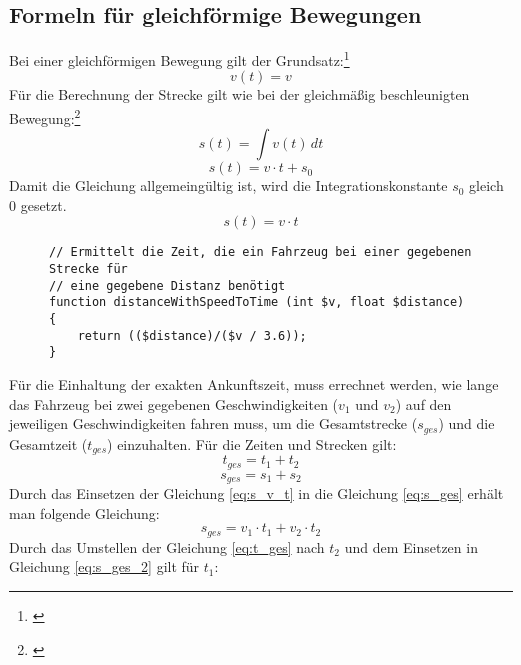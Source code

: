\subsection{Formeln für gleichförmige Bewegungen} \label{formulaGleichfoermig}
Bei einer gleichförmigen Bewegung gilt der Grundsatz:\footnote{\citet[S. 22]{richard2011technische}}
\begin{equation}
v(t) = v
\end{equation}
Für die Berechnung der Strecke gilt wie bei der gleichmäßig beschleunigten Bewegung:\footnote{\citet[S. 20]{richard2011technische}}
\begin{equation}
s(t) = \int v(t) \,dt
\end{equation}
\begin{equation}
s(t) =v \cdot t + s_{0}
\end{equation}
Damit die Gleichung allgemeingültig ist, wird die Integrationskonstante $s_{0}$ gleich 0 gesetzt.
\begin{equation}
s(t) =v \cdot t
\label{eq:s_v_t}
\end{equation}
\begin{figure}[H]
\begin{lstlisting}[caption={\textit{distanceWithSpeedToTime$($$)$} (\textit{functions\_math.php})},captionpos=b,label={lst:distanceWithSpeedToTime}]
// Ermittelt die Zeit, die ein Fahrzeug bei einer gegebenen Strecke für
// eine gegebene Distanz benötigt
function distanceWithSpeedToTime (int $v, float $distance) {
	return (($distance)/($v / 3.6));
}
\end{lstlisting}
\end{figure}
Für die Einhaltung der exakten Ankunftszeit, muss errechnet werden, wie lange das Fahrzeug bei zwei gegebenen Geschwindigkeiten ($v_1$ und $v_2$) auf den jeweiligen Geschwindigkeiten fahren muss, um die Gesamtstrecke ($s_{ges}$) und die Gesamtzeit ($t_{ges}$) einzuhalten. Für die Zeiten und Strecken gilt:
\begin{equation}
\label{eq:t_ges}
t_{ges} = t_{1} + t_{2}
\end{equation}
\begin{equation}
\label{eq:s_ges}
s_{ges} = s_{1} + s_{2}
\end{equation}
Durch das Einsetzen der Gleichung \eqref{eq:s_v_t} in die Gleichung \eqref{eq:s_ges} erhält man folgende Gleichung:
\begin{equation}
\label{eq:s_ges_2}
s_{ges} = v_{1} \cdot t_{1} + v_{2} \cdot t_{2}
\end{equation}
Durch das Umstellen der Gleichung \eqref{eq:t_ges} nach $t_{2}$ und dem Einsetzen in Gleichung \eqref{eq:s_ges_2} gilt für $t_{1}$:
